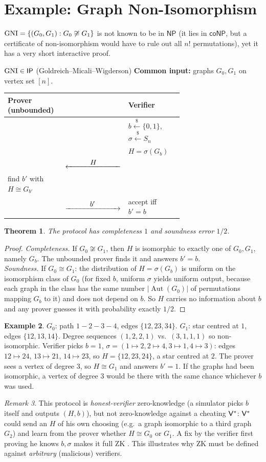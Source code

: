 \documentclass[11pt,a4paper]{report}
\makeatletter
\theoremstyle{plain}
\newtheorem{theorem}{Theorem}[chapter]
\theoremstyle{definition}
\newtheorem{example}[theorem]{Example}
\theoremstyle{remark}
\newtheorem{remark}[theorem]{Remark}
\newcommand{\getsr}{\xleftarrow{\$}}
\newcommand{\NP}{\mathsf{NP}}\newcommand{\BPP}{\mathsf{BPP}}\newcommand{\IP}{\mathsf{IP}}
\newcommand{\coNP}{\mathsf{coNP}}\newcommand{\PCP}{\mathsf{PCP}}
\newcommand{\ra}[1]{\xrightarrow{\makebox[2.5cm]{$#1$}}}
\newcommand{\la}[1]{\xleftarrow{\makebox[2.5cm]{$#1$}}}
\DeclareMathOperator{\Aut}{Aut}
\newenvironment{flow}[2]{%
  \par\smallskip\noindent
  \begin{tabular}{@{}L{0.34\linewidth} c L{0.34\linewidth}@{}}
  \textbf{#1} & & \textbf{#2}\\ \hline}{\end{tabular}\par\smallskip}
\makeatother
\begin{document}
\section{Example: Graph Non-Isomorphism}
\label{sec:gni}
$\operatorname{GNI}=\{(G_0,G_1): G_0\not\cong G_1\}$ is not known to be in $\NP$ (it lies in $\coNP$, but a certificate of non-isomorphism would have to rule out all $n!$ permutations), yet it has a very short interactive proof.
\begin{protocol}[label=pr:gni]{$\GNI\in\IP$ (Goldreich--Micali--Wigderson)}
\textbf{Common input:} graphs $G_0,G_1$ on vertex set $[n]$.
\begin{flow}{Prover (unbounded)}{Verifier}
 & & $b\getsr\{0,1\}$, $\sigma\getsr S_n$\\
 & & $H=\sigma(G_b)$\\
 & $\la{H}$ & \\
find $b'$ with $H\cong G_{b'}$ & & \\
 & $\ra{b'}$ & accept iff $b'=b$
\end{flow}
\end{protocol}
\begin{theorem}
The protocol has completeness $1$ and soundness error $1/2$.
\end{theorem}
\begin{proof}
\emph{Completeness.} If $G_0\not\cong G_1$, then $H$ is isomorphic to exactly one of $G_0,G_1$, namely $G_b$. The unbounded prover finds it and answers $b'=b$.\\
\emph{Soundness.} If $G_0\cong G_1$: the distribution of $H=\sigma(G_b)$ is uniform on the isomorphism class of $G_0$ (for fixed $b$, uniform $\sigma$ yields uniform output, because each graph in the class has the same number $|\Aut(G_0)|$ of permutations mapping $G_b$ to it) and does not depend on $b$. So $H$ carries no information about $b$ and any prover guesses it with probability exactly $1/2$.
\end{proof}
\begin{example}
$G_0$: path $1\!-\!2\!-\!3\!-\!4$, edges $\{12,23,34\}$. $G_1$: star centred at $1$, edges $\{12,13,14\}$. Degree sequences $(1,2,2,1)$ vs.\ $(3,1,1,1)$ so non-isomorphic. Verifier picks $b=1$, $\sigma=(1\mapsto2,2\mapsto4,3\mapsto1,4\mapsto3)$: edges $12\mapsto24$, $13\mapsto21$, $14\mapsto23$, so $H=\{12,23,24\}$, a star centred at $2$. The prover sees a vertex of degree $3$, so $H\cong G_1$ and answers $b'=1$. If the graphs had been isomorphic, a vertex of degree 3 would be there with the same chance whichever $b$ was used.
\end{example}
\begin{remark}
This protocol is \emph{honest-verifier} zero-knowledge (a simulator picks $b$ itself and outputs $(H,b)$), but not zero-knowledge against a cheating $\mathsf{V}^*$: $\mathsf{V}^*$ could send an $H$ of his own choosing (e.g.\ a graph isomorphic to a third graph $G_2$) and learn from the prover whether $H\cong G_0$ or $G_1$. A fix by the verifier first proving he knows $b,\sigma$ makes it full ZK \cite{GMW91}. This illustrates why ZK must be defined against \emph{arbitrary} (malicious) verifiers.
\end{remark}
\end{document}
